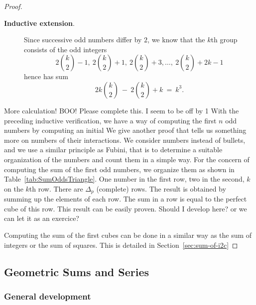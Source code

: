 \begin{proof}
\begin{description}
\item[{\bf Inductive extension}.]
%
Since successive odd numbers differ by $2$, we know that the $k$th
group consists of the odd integers
\[
2 {k \choose 2} -1, \ 2 {k \choose 2} +1, \ 2 {k \choose 2} +3 ,
\ldots, \
2 {k \choose 2} +2k-1
\]
hence has sum
\[
2k {k \choose 2} \ - \ 2 {k \choose 2} +k
\ = \ k^3.
\]
\end{description}

{\Arny More calculation!  BOO!  Please complete this.  I seem to be
  off by 1}
With the preceding inductive verification, we have a way of computing
the first $n$ odd numbers by computing an initial 
We give another proof that tells us something more on numbers of their interactions.
We consider numbers instead of bullets, and we use a similar principle as Fubini, that is to determine a
suitable organization of the numbers and count them in a simple way.
For the concern of computing the sum of the first odd numbers, we organize them as shown in Table~\ref{tab:SumOddsTriangle}.
One number in the first row, two in the second, $k$ on the $k$th row.
There are $\Delta_p$ (complete) rows. 
The result is obtained by summing up the elements of each row.
The sum in a row is equal to the perfect cube of this row.
This result can be easily proven. 
{\Denis Should I develop here? or we can let it as an exercice?}


\medskip

Computing the sum of the first cubes can be done in a similar way as the sum of integers or the sum of squares.
This is detailed in Section~\ref{sec:sum-of-i2c}
\end{proof}

\subsection{Geometric Sums and Series}
\label{sec:geometric-sums}


\subsubsection{General development}
\label{sec:general-geometric}

